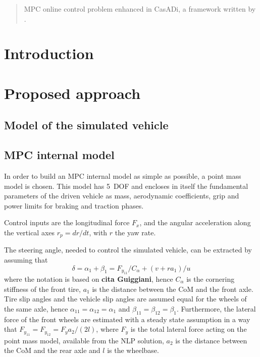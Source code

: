 \documentclass[conference]{IEEEtran} %
\begin{document}

\begin{abstract}
MPC online control problem enhanced in CasADi, a framework written by \citet{Andersson2019}.
\end{abstract}

\IEEEpeerreviewmaketitle

\section{Introduction}



\section{Proposed approach} %


\subsection{Model of the simulated vehicle}


\subsection{MPC internal model}

In order to build an MPC internal model as simple as possible, a point mass model is chosen.
This model has 5~DOF and encloses in itself the fundamental parameters of the driven vehicle as mass, aerodynamic coefficients, grip and power limits for braking and traction phases.

Control inputs are the longitudinal force $F_{x}$, and the angular acceleration along the vertical axes $r_p = dr/dt$, with $r$ the yaw rate.

The steering angle, needed to control the simulated vehicle, can be extracted by assuming that
\begin{equation}
\delta = \alpha_{1} + \beta_1 = F_{y_{11}}/C_\alpha + (v + ra_1)/u
\end{equation}
where the notation is based on \textbf{cita Guiggiani}, hence $C_\alpha$ is the cornering stiffness of the front tire, $a_1$ is the distance between the CoM and the front axle.
Tire slip angles and the vehicle slip angles are assumed equal for the wheels of the same axle, hence $\alpha_{11} = \alpha_{12} = \alpha_{1}$ and  $\beta_{11} = \beta_{12} = \beta_{1}$.
Furthermore, the lateral force of the front wheels are estimated with a steady state assumption in a way that $F_{y_{11}} = F_{y_{12}} = F_{y}a_2/(2l)$, where $F_{y}$ is the total lateral force acting on the point mass model, available from the NLP solution, $a_2$ is the distance between the CoM and the rear axle and $l$ is the wheelbase.
\end{document}
